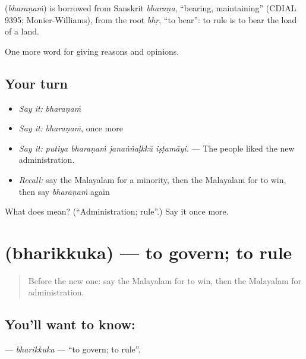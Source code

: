 \begin{cousinweb}
\textbf{} (\emph{bharaṇaṁ}) is borrowed from Sanskrit \emph{bharaṇa}, \textquotedblleft{}bearing, maintaining\textquotedblright{} (CDIAL 9395; Monier-Williams), from the root \emph{bhṛ}, \textquotedblleft{}to bear\textquotedblright{}: to rule is to bear the load of a land.
\end{cousinweb}

\begin{grammarlens}[title={What you've built}]
One more word for giving reasons and opinions.
\end{grammarlens}

\subsection*{Your turn}
\begin{itemize}
\raggedright
  \item \emph{Say it:} \emph{bharaṇaṁ}
  \item \emph{Say it:} \emph{bharaṇaṁ}, once more
  \item \emph{Say it:} \emph{putiya bharaṇaṁ janaṅṅaḷkkŭ iṣṭamāyi.} — The people liked the new administration.
  \item \emph{Recall:} say the Malayalam for a minority, then the Malayalam for to win, then say \emph{bharaṇaṁ} again
\end{itemize}

\begin{tcolorbox}[breakable,colback=teal!4,colframe=teal!35!black,title={Before you move on}]
What does  mean? (\textquotedblleft{}Administration; rule\textquotedblright{}.) Say it once more.
\end{tcolorbox}
\section[\texorpdfstring{\ml{ഭരിക്കുക} (bharikkuka)}{ഭരിക്കുക (bharikkuka)}]{ (bharikkuka) — to govern; to rule}

\label{lesson:ML-C421-bharikkuka}



\begin{quote}
Before the new one: say the Malayalam for to win, then the Malayalam for administration.
\end{quote}

\subsection*{You'll want to know: }
\textbf{} — \emph{bharikkuka} — \textquotedblleft{}to govern; to rule\textquotedblright{}.

